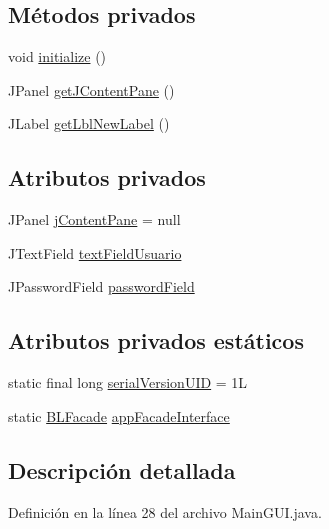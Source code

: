 \subsection*{Métodos privados}
\begin{DoxyCompactItemize}
\item 
void \mbox{\hyperlink{classgui_1_1MainGUI_a2659b4cdf4e94d6ffc332f16afc46462}{initialize}} ()
\item 
J\+Panel \mbox{\hyperlink{classgui_1_1MainGUI_ae3ce89a59dcf27273ec658ee42cd61b8}{get\+J\+Content\+Pane}} ()
\item 
J\+Label \mbox{\hyperlink{classgui_1_1MainGUI_a77a13e7a135020c180cec4b1d73a9cd9}{get\+Lbl\+New\+Label}} ()
\end{DoxyCompactItemize}
\subsection*{Atributos privados}
\begin{DoxyCompactItemize}
\item 
J\+Panel \mbox{\hyperlink{classgui_1_1MainGUI_a06836509371b16181fdff6732938b7d3}{j\+Content\+Pane}} = null
\item 
J\+Text\+Field \mbox{\hyperlink{classgui_1_1MainGUI_a55b77c52b8af8b275ac73bb0965ed2f1}{text\+Field\+Usuario}}
\item 
J\+Password\+Field \mbox{\hyperlink{classgui_1_1MainGUI_a61d033008de636b7bec5658cdebe8fd3}{password\+Field}}
\end{DoxyCompactItemize}
\subsection*{Atributos privados estáticos}
\begin{DoxyCompactItemize}
\item 
static final long \mbox{\hyperlink{classgui_1_1MainGUI_a75dfef8d845a0c8de7a6476c7f7d35e1}{serial\+Version\+U\+ID}} = 1L
\item 
static \mbox{\hyperlink{interfacebusinessLogic_1_1BLFacade}{B\+L\+Facade}} \mbox{\hyperlink{classgui_1_1MainGUI_ab98521baef1c320483057345b5546d8d}{app\+Facade\+Interface}}
\end{DoxyCompactItemize}


\subsection{Descripción detallada}


Definición en la línea 28 del archivo Main\+G\+U\+I.\+java.



